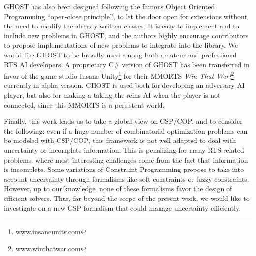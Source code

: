 \documentclass[journal]{IEEEtran}
\newcommand{\csp}{\textsc{CSP}\xspace}
\newcommand{\cop}{\textsc{COP}\xspace}
\newcommand{\ghost}{\textsc{GHOST}\xspace}
\begin{document}
\ghost has also been designed following the famous Object Oriented
Programming ``open-close principle'', to let the door open for
extensions without the need to modify the already written classes. It
is easy to implement and to include new problems in \ghost, and the
authors highly encourage contributors to propose implementations of
new problems to integrate into the library. We would like \ghost to be
broadly used among both amateur and professional RTS AI developers. A
proprietary C\# version of \ghost has been transferred in favor of the game
studio Insane
Unity\footnote{\href{http://www.insaneunity.com}{www.insaneunity.com}}
for their MMORTS \emph{Win That
  War!}\footnote{\href{http://www.winthatwar.com}{www.winthatwar.com}}
currently in alpha version. \ghost is used both for developing an
adversary AI player, but also for making a taking-the-reins AI when
the player is not connected, since this MMORTS is a persistent
world.


Finally, this work leads us to take a global view on \csp/\cop, and to
consider the  following: even  if a huge  number of  combinatorial optimization problems can be modeled with \csp/\cop, this framework is
not   well   adapted   to   deal  with   uncertainty   or   incomplete
information. This  is penalizing for many  RTS-related problems, where
most interesting challenges come  from the fact that information is
incomplete. Some variations of  Constraint Programming propose to take
into account  uncertainty through formalisms like  soft constraints or
fuzzy constraints. However, up to our  knowledge, none of these formalisms  favor the design
of efficient solvers. Thus, far beyond the scope
of  the present  work, we  would  like to  investigate on  a new  \csp
formalism that could manage uncertainty efficiently.




\ifCLASSOPTIONcaptionsoff
  \newpage
\fi



\end{document}
